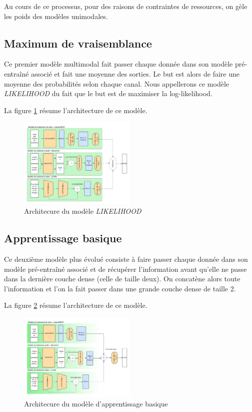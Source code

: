 \documentclass[a4paper]{article}
\begin{document}
Au cours de ce processus, pour des raisons de contraintes de ressources, on gèle les poids des modèles unimodales.

\subsection{Maximum de vraisemblance}
Ce premier modèle multimodal fait passer chaque donnée dans son modèle pré-entraîné associé et fait une moyenne des sorties. Le but est alors de faire une moyenne des probabilités selon chaque canal. Nous appellerons ce modèle \textit{LIKELIHOOD} du fait que le but est de maximiser la log-likelihood.

La figure \ref{fig: likelihood} résume l'architecture de ce modèle.

\begin{figure}[H]
    \centering
    \includegraphics[width=0.5\textwidth]{Likelihood.png}
    \caption{Architecure du modèle \textit{LIKELIHOOD}}
    \label{fig: likelihood}
\end{figure}

\subsection{Apprentissage basique}
Ce deuxième modèle plus évolué consiste à faire passer chaque donnée dans son modèle pré-entraîné associé et de récupérer l'information avant qu'elle ne passe dans la dernière couche dense (celle de taille deux). On concatène alors toute l'information et l'on la fait passer dans une grande couche dense de taille 2.

La figure \ref{fig: basique} résume l'architecture de ce modèle.

\begin{figure}[H]
    \centering
    \includegraphics[width=0.5\textwidth]{second_model.png}
    \caption{Architecure du modèle d'apprentissage basique}
    \label{fig: basique}
\end{figure}
\end{document}
